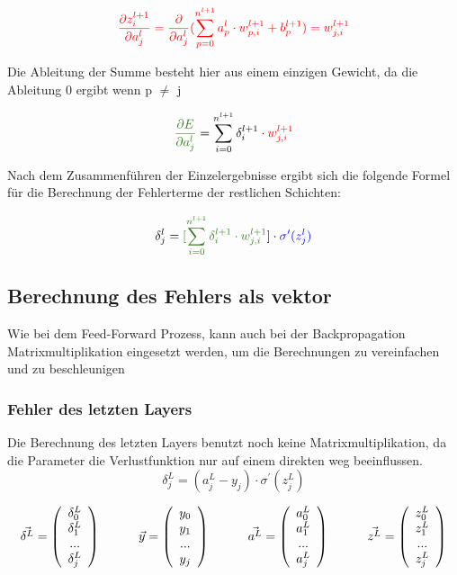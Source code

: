 \documentclass{article}
\begin{document}
\[ \textcolor{red}{ \frac{\partial z_i^{l+1}}{\partial a_j^{l}}
= \frac{\partial}{\partial a_j^{l}} (\sum_{p = 0}^{n^{l+1}} a_p^{l} \cdot w_{p,i}^{l+1} + b_p^{l+1}) = w_{j, i}^{l+1} } \]
\begin{flushleft}
    Die Ableitung der Summe besteht hier aus einem einzigen Gewicht, da die Ableitung $0$ ergibt wenn p $\neq$ j
\end{flushleft}
\[ \textcolor{OliveGreen}{ \frac{\partial E}{\partial a_j^{l}} } = \sum_{i = 0}^{n^{l+1}} \delta_i^{l+1} \cdot \textcolor{red}{ w_{j,i}^{l+1} } \]
\begin{flushleft}
    Nach dem Zusammenführen der Einzelergebnisse ergibt sich die folgende Formel für die Berechnung der Fehlerterme der restlichen Schichten:
\end{flushleft}
\[ \delta_j^{l} = \textcolor{OliveGreen}{[\sum_{i = 0}^{n^{l+1}} \delta_i^{l+1} \cdot w_{j,i}^{l+1} }] \cdot \textcolor{blue}{ \sigma^{\prime}(z_j^{l}) } \]

\subsection{Berechnung des Fehlers als vektor}
Wie bei dem Feed-Forward Prozess, kann auch bei der Backpropagation Matrixmultiplikation eingesetzt werden,
 um die Berechnungen zu vereinfachen und zu beschleunigen

\subsubsection{Fehler des letzten Layers}
Die Berechnung des letzten Layers benutzt noch keine Matrixmultiplikation, da die Parameter die Verlustfunktion nur auf einem direkten weg beeinflussen.
\[ \delta_j^L = (a_j^L - y_j) \cdot \sigma^{\prime} (z_j^L)  \]

\[ \vec{\delta^L} = \left( \begin{array}{c}
     \delta_0^L \\ \delta_1^L \\ ... \\ \delta_j^L 
\end{array} \right)
\kern 30pt
\vec{y} = \left( \begin{array} {c}
    y_0 \\ y_1 \\ ... \\ y_j
\end{array} \right) 
\kern 30pt
\vec{a^L} = \left(\begin{array}{c}
    a_0^L \\ a_1^L \\ ... \\ a_j^L
\end{array} \right) 
\kern 30pt
\vec{z^L} = \left(\begin{array}{c}
    z_0^L \\ z_1^L \\ ... \\ z_j^L
\end{array} \right) 
\]
\end{document}
